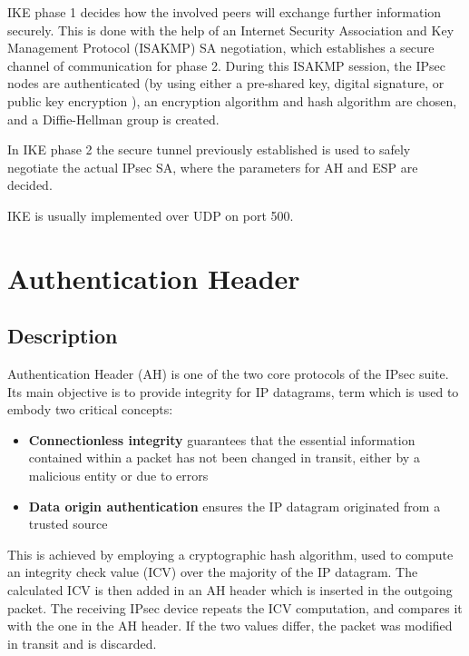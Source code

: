 \documentclass[a4paper,12pt]{report}
\begin{document}
		IKE phase 1 decides how the involved peers will exchange further information securely. This is done with the help of an Internet Security Association and Key Management Protocol (ISAKMP) SA negotiation, which establishes a secure channel of communication for phase 2. During this ISAKMP session, the IPsec nodes are authenticated (by using either a pre-shared key, digital signature, or public key encryption \cite{rfc5996}), an encryption algorithm and hash algorithm are chosen, and a Diffie-Hellman group is created.
		
		In IKE phase 2 the secure tunnel previously established is used to safely negotiate the actual IPsec SA, where the parameters for AH and ESP are decided. 
		
		IKE is usually implemented over UDP on port 500.
		
		\section{Authentication Header}
		\subsection{Description}
		Authentication Header (AH) is one of the two core protocols of the IPsec suite. Its main objective is to provide integrity for IP datagrams, term which is used to embody two critical concepts:
		\begin{itemize}
			\item \textbf{Connectionless integrity} guarantees that the essential information contained within a packet has not been changed in transit, either by a malicious entity or due to errors
			\item \textbf{Data origin authentication} ensures the IP datagram originated from a trusted source
		\end{itemize}
		
		This is achieved by employing a cryptographic hash algorithm, used to compute an integrity check value (ICV) over the majority of the IP datagram. The calculated ICV is then added in an AH header which is inserted in the outgoing packet. The receiving IPsec device repeats the ICV computation, and compares it with the one in the AH header. If the two values differ, the packet was modified in transit and is discarded.
		
\end{document}
